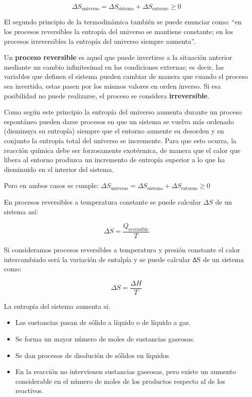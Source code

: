\documentclass[
  spanish,
]{article}
\providecommand{\tightlist}{%
  \setlength{\itemsep}{0pt}\setlength{\parskip}{0pt}}
\begin{document}
\[\Delta S_\text{universo} = \Delta S_\text{sistema} + \Delta S_\text{entorno} \ge 0\]

El segundo principio de la termodinámica también se puede enunciar como:
``en los procesos reversibles la entropía del universo se mantiene
constante; en los procesos irreversibles la entropía del universo
siempre aumenta''.

Un \textbf{proceso reversible} es aquel que puede invertirse a la
situación anterior mediante un cambio infinitesimal en las condiciones
externas; es decir, las variables que definen el sistema pueden cambiar
de manera que cuando el proceso sea invertido, estas pasen por los
mismos valores en orden inverso. Si esa posibilidad no puede realizarse,
el proceso se considera \textbf{irreversible}.

Como según este principio la entropía del universo aumenta durante un
proceso espontáneo pueden darse procesos en que un sistema se vuelva más
ordenado (disminuya su entropía) siempre que el entorno aumente su
desorden y en conjunto la entropía total del universo se incremente.
Para que esto ocurra, la reacción química debe ser forzosamente
exotérmica, de manera que el calor que libera al entorno produzca un
incremento de entropía superior a lo que ha disminuido en el interior
del sistema.

\hfill{}

Pero en ambos casos se cumple:
\(\Delta S_\text{universo} = \Delta S_\text{sistema} + \Delta S_\text{entorno} \ge 0\)

En procesos reversibles a temperatura constante se puede calcular
\(\Delta S\) de un sistema así:

\[\Delta S = \frac{Q_\text{reversible}}{T}\]

Si consideramos procesos reversibles a temperatura y presión constante
el calor intercambiado será la variación de entalpía y se puede calcular
∆S de un sistema como:

\[\Delta S = \frac{\Delta H}{T}\]

La entropía del sistema aumenta si:

\begin{itemize}
\tightlist
\item
  Las sustancias pasan de sólido a líquido o de líquido a gas.
\item
  Se forma un mayor número de moles de sustancias gaseosas.
\item
  Se dan procesos de disolución de sólidos en líquidos
\item
  En la reacción no intervienen sustancias gaseosas, pero existe un
  aumento considerable en el número de moles de los productos respecto
  al de los reactivos.
\end{itemize}
\end{document}
